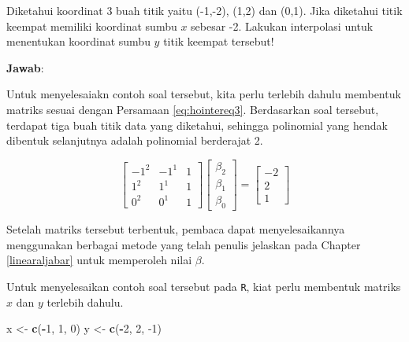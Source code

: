 \documentclass[]{book}
\newenvironment{Shaded}{\begin{snugshade}}{\end{snugshade}}
\newcommand{\DecValTok}[1]{\textcolor[rgb]{0.00,0.00,0.81}{#1}}
\newcommand{\KeywordTok}[1]{\textcolor[rgb]{0.13,0.29,0.53}{\textbf{#1}}}
\newcommand{\NormalTok}[1]{#1}
\newcommand{\OperatorTok}[1]{\textcolor[rgb]{0.81,0.36,0.00}{\textbf{#1}}}
\newcommand{\StringTok}[1]{\textcolor[rgb]{0.31,0.60,0.02}{#1}}
\theoremstyle{definition}
\theoremstyle{definition}
\theoremstyle{definition}
\theoremstyle{remark}
\let\BeginKnitrBlock\begin \let\EndKnitrBlock\end
\begin{document}
\BeginKnitrBlock{example}
\protect\hypertarget{exm:hopoliexmp}{}{\label{exm:hopoliexmp} }Diketahui koordinat 3 buah titik yaitu (-1,-2), (1,2) dan (0,1). Jika diketahui titik keempat memiliki koordinat sumbu \(x\) sebesar -2. Lakukan interpolasi untuk menentukan koordinat sumbu \(y\) titik keempat tersebut!
\EndKnitrBlock{example}

\textbf{Jawab}:

Untuk menyelesaiakn contoh soal tersebut, kita perlu terlebih dahulu membentuk matriks sesuai dengan Persamaan \eqref{eq:hointereq3}. Berdasarkan soal tersebut, terdapat tiga buah titik data yang diketahui, sehingga polinomial yang hendak dibentuk selanjutnya adalah polinomial berderajat 2.

\begin{equation*}
\begin{bmatrix}
     -1^2   & -1^{1}  & 1            \\[0.3em]
     1^2    & 1^{1}   & 1            \\[0.3em]
     0^2    & 0^{1}   & 1
     \end{bmatrix}
\begin{bmatrix}
     \beta_2                                          \\[0.3em]
     \beta_1                                          \\[0.3em]
     \beta_0                                       
     \end{bmatrix}
= \begin{bmatrix}
     -2                                          \\[0.3em]
     2                                           \\[0.3em]
     1                                       
     \end{bmatrix}
\end{equation*}

Setelah matriks tersebut terbentuk, pembaca dapat menyelesaikannya menggunakan berbagai metode yang telah penulis jelaskan pada Chapter \ref{linearaljabar} untuk memperoleh nilai \(\beta\).

Untuk menyelesaikan contoh soal tersebut pada \texttt{R}, kiat perlu membentuk matriks \(x\) dan \(y\) terlebih dahulu.

\begin{Shaded}
\begin{Highlighting}[]
\NormalTok{x <-}\StringTok{ }\KeywordTok{c}\NormalTok{(}\OperatorTok{-}\DecValTok{1}\NormalTok{, }\DecValTok{1}\NormalTok{, }\DecValTok{0}\NormalTok{)}
\NormalTok{y <-}\StringTok{ }\KeywordTok{c}\NormalTok{(}\OperatorTok{-}\DecValTok{2}\NormalTok{, }\DecValTok{2}\NormalTok{, }\DecValTok{-1}\NormalTok{)}
\end{Highlighting}
\end{Shaded}
\end{document}
